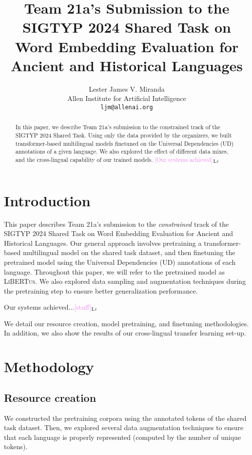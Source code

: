 \documentclass[11pt]{article}
\title{Team 21a's Submission to the SIGTYP 2024 Shared Task on Word Embedding Evaluation for Ancient and Historical Languages}
\author{Lester James V. Miranda \\
  Allen Institute for Artificial Intelligence \\
  \texttt{ljm@allenai.org} \\
}
\newcommand{\draftonly}[1]{#1}
\newcommand{\draftcomment}[3]{\draftonly{\textcolor{#2}{[#3]{$_{\textsc{#1}}$}}}}
\newcommand{\lj}[1]{\draftcomment{Lj}{violet}{#1}}
\newcommand{\libertus}{\textsc{LiBERTus}}
\begin{document}
\maketitle

\begin{abstract}
In this paper, we describe Team 21a's submission to the constrained track of the SIGTYP 2024 Shared Task.
Using only the data provided by the organizers, we built transformer-based multilingual models finetuned on the Universal Dependencies (UD) annotations of a given language.
We also explored the effect of different data mixes, and the cross-lingual capability of our trained models.
\lj{Our systems achieved}
\end{abstract}

\section{Introduction}
This paper describes Team 21a's submission to the \textit{constrained} track of the SIGTYP 2024 Shared Task on Word Embedding Evaluation for Ancient and Historical Languages.
Our general approach involves pretraining a transformer-based multilingual model on the shared task dataset, and then finetuning the pretrained model using the Universal Dependencies (UD) annotations of each language.
Throughout this paper, we will refer to the pretrained model as \libertus{}.
We also explored data sampling and augmentation techniques during the pretraining step to ensure better generalization performance.

Our systems achieved...\lj{stuff}


We detail our resource creation, model pretraining, and finetuning methodologies.
In addition, we also show the results of our cross-lingual transfer learning set-up.

\section{Methodology}

% 
% 


\subsection{Resource creation}

We constructed the pretraining corpora using the annotated tokens of the shared task dataset.
Then, we explored several data augmentation techniques to ensure that each language is properly represented (computed by the number of unique tokens).
\end{document}
